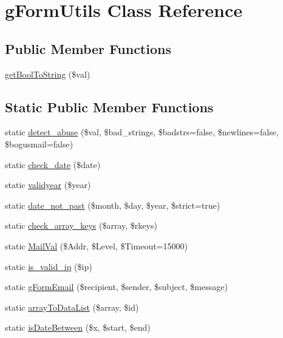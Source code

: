 \hypertarget{classg_form_utils}{\section{g\-Form\-Utils Class Reference}
\label{classg_form_utils}
}
\subsection*{Public Member Functions}
\begin{DoxyCompactItemize}
\item 
\hyperlink{classg_form_utils_a9ace0e4b691466c8d2234fb8daa8bd8a}{get\-Bool\-To\-String} (\$val)
\end{DoxyCompactItemize}
\subsection*{Static Public Member Functions}
\begin{DoxyCompactItemize}
\item 
static \hyperlink{classg_form_utils_af879bc65f8bf1a8bf4961dbf98e12a43}{detect\-\_\-abuse} (\$val, \$bad\-\_\-strings, \$badstrs=false, \$newlines=false, \$bogusmail=false)
\item 
static \hyperlink{classg_form_utils_a5a536c160f2f6973bb35877fcb7af7a3}{check\-\_\-date} (\$date)
\item 
static \hyperlink{classg_form_utils_a30204d03faad7f4a6e3934a93b18e3b7}{validyear} (\$year)
\item 
static \hyperlink{classg_form_utils_ae43c8dc80d220c74426b6945d09b3d9f}{date\-\_\-not\-\_\-past} (\$month, \$day, \$year, \$strict=true)
\item 
static \hyperlink{classg_form_utils_a4e91969eaabe690ada15574f1e56121a}{check\-\_\-array\-\_\-keys} (\$array, \$rkeys)
\item 
static \hyperlink{classg_form_utils_a41fe8b8a7326496b9b98358fd231d89e}{Mail\-Val} (\$Addr, \$Level, \$Timeout=15000)
\item 
static \hyperlink{classg_form_utils_af11831fa6be865c1221fb0262204a0ec}{is\-\_\-valid\-\_\-ip} (\$ip)
\item 
static \hyperlink{classg_form_utils_a929b9f12ce7ee01a3ac51dc1a647fedf}{g\-Form\-Email} (\$recipient, \$sender, \$subject, \$message)
\item 
static \hyperlink{classg_form_utils_a8c49bf0ddcfe9dbaae3143996ab93e13}{array\-To\-Data\-List} (\$array, \$id)
\item 
static \hyperlink{classg_form_utils_ab791012972e76d999b6a4263e1eea2d5}{is\-Date\-Between} (\$x, \$start, \$end)
\end{DoxyCompactItemize}


